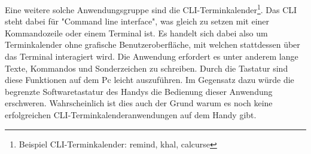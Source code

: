 %
\newline
\myNewSection
Eine weitere solche Anwendungsgruppe sind die CLI-Terminkalender\footnote{Beispiel CLI-Terminkalender: remind\cite{cli_remind}, khal\cite{cli_khal}, calcurse\cite{cli_calcurse}}. Das CLI steht dabei für "Command line interface", was gleich zu setzen mit einer Kommandozeile oder einem Terminal ist. Es handelt sich dabei also um Terminkalender ohne grafische Benutzeroberfläche, mit welchen stattdessen über das Terminal interagiert wird. Die Anwendung erfordert es unter anderem lange Texte, Kommandos und Sonderzeichen zu schreiben. Durch die Tastatur sind diese Funktionen auf dem Pc leicht auszuführen. Im Gegensatz dazu würde die begrenzte Softwaretastatur des Handys die Bedienung dieser Anwendung erschweren. Wahrscheinlich ist dies auch der Grund warum es noch keine erfolgreichen CLI-Terminkalenderanwendungen auf dem Handy gibt.%
%
%

